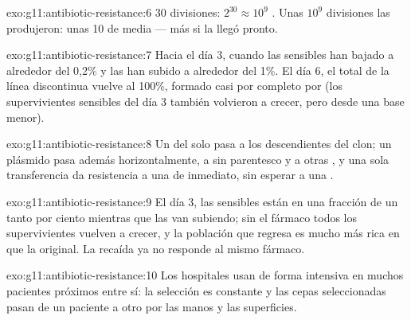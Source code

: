\begin{solution}{exo:g11:antibiotic-resistance:6}
30 divisiones: $2^{30} \approx 10^9$ . Unas $10^9$ divisiones
las produjeron: unas 10   de media --- más si la
 llegó pronto.
\end{solution}

\begin{solution}{exo:g11:antibiotic-resistance:7}
Hacia el día 3, cuando las  sensibles han bajado a alrededor del
0,2\% y las  han subido a alrededor del 1\%. El día 6, el
total de la línea discontinua vuelve al 100\%, formado casi por
completo por   (los supervivientes sensibles del día
3 también volvieron a crecer, pero desde una base menor).
\end{solution}

\begin{solution}{exo:g11:antibiotic-resistance:8}
Un  del  solo pasa a los descendientes del clon; un
plásmido pasa además horizontalmente, a  sin parentesco y a
otras , y una sola transferencia da resistencia a una  de
inmediato, sin esperar a una .
\end{solution}

\begin{solution}{exo:g11:antibiotic-resistance:9}
El día 3, las  sensibles están en una fracción de un tanto por
ciento mientras que las  van subiendo; sin el fármaco todos
los supervivientes vuelven a crecer, y la población que regresa es
mucho más rica en   que la original. La recaída ya no
responde al mismo fármaco.
\end{solution}

\begin{solution}{exo:g11:antibiotic-resistance:10}
Los hospitales usan  de forma intensiva en muchos pacientes
próximos entre sí: la selección es constante y las cepas seleccionadas
pasan de un paciente a otro por las manos y las superficies.
\end{solution}

